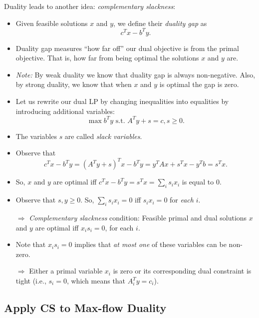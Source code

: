 \documentclass{article}
\begin{document}
Duality leads to another idea: {\em complementary slackness}:
\begin{itemize}
\item Given feasible solutions $x$ and $y$, we define their {\em duality gap} as 
\[
c^Tx-b^Ty.
\]
\item Duality gap measures ``how far off'' our dual objective is from the primal objective. That  is, how far from being optimal the solutions $x$ and $y$ are. 
\item {\em Note:} By weak duality we know that duality gap is always non-negative. Also, by strong duality, we know that when $x$ and $y$ is optimal the gap is zero. 
\item Let us rewrite our dual LP by changing inequalities into equalities by introducing additional variables:
\[
\max b^T y \text{ s.t. } A^Ty+s=c, s\geq 0.
\]
\item The variables $s$ are called {\em slack variables}.
\item Observe that
\[
c^Tx-b^Ty = (A^Ty+s)^Tx-b^Ty = y^TAx+s^Tx-y^Tb=s^Tx.
\]
\item So, $x$ and $y$ are optimal iff $c^Tx-b^Ty=s^Tx=\sum_i s_i x_i$ is equal to $0$.
\item Observe that $s,y\geq 0$. So, $\sum_i s_i x_i=0$ iff $s_ix_i=0$ for {\em each} $i$. 


$\Rightarrow$ {\em Complementary slackness} condition: Feasible primal and dual solutions $x$ and $y$ are optimal iff $x_is_i=0$, for each $i$. 

\item Note that $x_is_i=0$ implies that {\em at most one} of these variables can be non-zero. 

$\Rightarrow$ Either a primal variable $x_i$ is zero or its corresponding dual constraint is tight (i.e., $s_i=0$, which means that $A_i^Ty=c_i$).
\end{itemize}


\subsection{Apply CS to Max-flow Duality}
\end{document}
